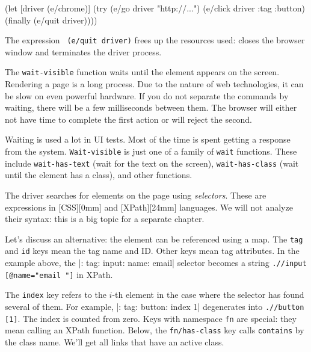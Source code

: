 
\begin{english}
  \begin{clojure}
(let [driver (e/chrome)]
  (try
    (e/go driver "http://...")
    (e/click driver {:tag :button})
    (finally
      (e/quit driver))))
  \end{clojure}
\end{english}

The expression \verb| (e/quit driver)| frees up the resources used: closes the browser window and terminates the driver process.

The \verb|wait-visible| function waits until the element appears on the screen. Rendering a page is a long process. Due to the nature of web technologies, it can be slow on even powerful hardware. If you do not separate the commands by waiting, there will be a few milliseconds between them. The browser will either not have time to complete the first action or will reject the second.

Waiting is used a lot in UI tests. Most of the time is spent getting a response from the system. \verb|Wait-visible| is just one of a family of \verb|wait| functions. These include \verb|wait-has-text| (wait for the text on the screen), \verb|wait-has-class| (wait until the element has a class), and other functions.


The driver searches for elements on the page using \emph{selectors}. These are expressions in [CSS][0mm] and [XPath][24mm] languages. We will not analyze their syntax: this is a big topic for a separate chapter.

Let's discuss an alternative: the element can be referenced using a map. The \verb|tag| and \verb|id| keys mean the tag name and ID. Other keys mean tag attributes. In the example above, the \spverb|{: tag: input: name: email}| selector becomes a string \verb|.//input [@name="email "]| in XPath.


The \verb|index| key refers to the $i$-th element in the case where the selector has found several of them. For example, \spverb|{: tag: button: index 1}| degenerates into \verb|.//button [1]|. The index is counted from zero. Keys with namespace \verb|fn| are special: they mean calling an XPath function. Below, the \verb|fn/has-class| key calls \verb|contains| by the class name. We'll get all links that have an active class.


